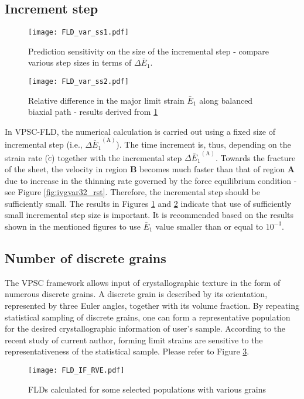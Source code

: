\documentclass[12pt]{amsart}
\begin{document}
\subsection{Increment step}
\label{sec:incr}
\begin{figure}[b]
  \texttt{[image: FLD\_var\_ss1.pdf]}
  \caption{Prediction sensitivity on the size of the incremental step - compare various step sizes in terms of $\Delta{\bar{E}_1}.$}
  \label{fig:sens_d1}
\end{figure}
\begin{figure}
  \texttt{[image: FLD\_var\_ss2.pdf]}
  \caption{Relative difference in the major limit strain $\bar{E}_1$ along balanced biaxial path - results derived from \ref{fig:sens_d1}}
  \label{fig:sens_d2}
\end{figure}
In VPSC-FLD, the numerical calculation is carried out using a fixed size of incremental step (i.e., $\Delta{\bar{E}_1}^\mathrm{(A)}$).
The time increment is, thus, depending on the strain rate ($\dot{c}$) together with the incremental step $\Delta{\bar{E}_1}^\mathrm{(A)}$.
Towards the fracture of the sheet, the velocity in region \textbf{B} becomes much faster than that of region \textbf{A}
due to increase in the thinning rate governed by the force equilibrium condition - see Figure \ref{fig:ivgvar32_rst}.
Therefore, the incremental step should be sufficiently small.
The results in Figures \ref{fig:sens_d1} and \ref{fig:sens_d2} indicate that use of sufficiently small incremental step size is important.
It is recommended based on the results shown in the mentioned figures to use $\bar{E}_1$ value smaller than or equal to $10^{-3}$.
\subsection{Number of discrete grains}
\label{sec:ngr}
The VPSC framework allows input of crystallographic texture in the form of numerous discrete grains.
A discrete grain is described by its orientation, represented by three Euler angles, together with its volume fraction.
By repeating statistical sampling of discrete grains, one can form a representative population for the desired crystallographic information of user's sample.
According to the recent study of current author, forming limit strains are sensitive to the representativeness of the statistical sample.
Please refer to Figure \ref{fig:sens_pop}.
\begin{figure}
  \texttt{[image: FLD\_IF\_RVE.pdf]}
  \caption{FLDs calculated for some selected populations with various grains}
  \label{fig:sens_pop}
\end{figure}
\end{document}

